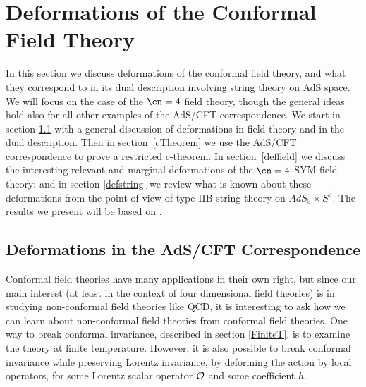 \section{Deformations of the Conformal Field Theory}
\label{deformations}

In this section we discuss deformations of the conformal field theory, and
what they correspond to in its dual description involving string theory on
AdS space. We will focus on the case of the $\cn=4$ field theory, though
the general ideas hold also for all other examples of the AdS/CFT
correspondence. We start in section \ref{defintro} with a general
discussion of deformations in field theory and in the dual description.
Then in section~\ref{cTheorem} we use the AdS/CFT correspondence to prove a
restricted c-theorem.  In section~\ref{deffield} we discuss the interesting
relevant and marginal deformations of the $\cn=4$ SYM field theory; and in
section \ref{defstring} we review what is known about these deformations
from the point of view of type IIB string theory on $AdS_5\times S^5$. The
results we present will be based on \cite{aks_unpublished,
Girardello:1998pd,Distler:1998gb,Khavaev:1998fb,Karch:1999pv,
Freedman:1999gp}.





 \subsection{Deformations in the AdS/CFT Correspondence}
 \label{defintro}

 Conformal field theories have many applications in their own right,
 but since our main interest (at least in the context of four
 dimensional field theories) is in studying non-conformal field
 theories like QCD, it is interesting to ask how we can learn about
 non-conformal field theories from conformal field theories. One way to
 break conformal invariance, described in section \ref{FiniteT}, is to examine
 the theory at finite temperature. However, it is also possible to
 break conformal invariance while preserving Lorentz invariance, by
 deforming the action by local operators,
 for some Lorentz scalar operator $\cal O$ and some coefficient
 $h$.

